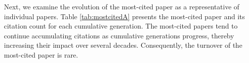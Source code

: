 Next, we examine the evolution of the most-cited paper as a representative of individual papers. Table \ref{tab:mostcitedA} presents the most-cited paper and its citation count for each cumulative generation. The most-cited papers tend to continue accumulating citations as cumulative generations progress, thereby increasing their impact over several decades. Consequently, the turnover of the most-cited paper is rare.
